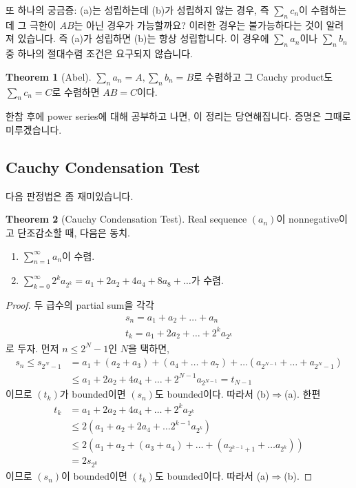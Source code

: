 \documentclass[12pt]{article}
\theoremstyle{definition}
\newtheorem{thm}{Theorem}[section]
\begin{document}
또 하나의 궁금증: (a)는 성립하는데 (b)가 성립하지 않는 경우, 즉 \(\sum_n c_n\)이 수렴하는데 그 극한이 \(AB\)는 아닌 경우가 가능할까요? 이러한 경우는 불가능하다는 것이 알려져 있습니다. 즉 (a)가 성립하면 (b)는 항상 성립합니다. 이 경우에 \(\sum_n a_n\)이나 \(\sum_n b_n\) 중 하나의 절대수렴 조건은 요구되지 않습니다.

\begin{thm}[Abel]
	\(\sum_n a_n = A, \sum_n b_n = B\)로 수렴하고 그 Cauchy product도 \(\sum_n c_n = C\)로 수렴하면 \(AB = C\)이다.
\end{thm}

한참 후에 power series에 대해 공부하고 나면, 이 정리는 당연해집니다. 증명은 그때로 미루겠습니다.

\subsection{Cauchy Condensation Test}

다음 판정법은 좀 재미있습니다.

\begin{thm}[Cauchy Condensation Test]
	Real sequence \((a_n)\)이 nonnegative이고 단조감소할 때, 다음은 동치.
	\begin{enumerate}[label=(\alph*), leftmargin=2\parindent]
		\item
		\(\sum_{n=1}^\infty a_n\)이 수렴.
		\item
		\(\sum_{k=0}^\infty 2^k a_{2^k} = a_1 + 2a_2 + 4a_4 + 8a_8 + \ldots\)가 수렴.
	\end{enumerate}
\end{thm}
\begin{proof}
	두 급수의 partial sum을 각각
	\begin{gather*}
		s_n = a_1 + a_2 + \ldots + a_n\\
		t_k = a_1 + 2a_2 + \ldots + 2^k a_{2^k}
	\end{gather*}
	로 두자. 먼저 \(n \le 2^N - 1\)인 \(N\)을 택하면,
	\begin{align*}
		s_n \le s_{2^N - 1} &= a_1 + (a_2 + a_3) + (a_4 + \ldots + a_7) + \ldots  (a_{2^{N-1}} + \ldots + a_{2^N - 1})\\
		& \le a_1 + 2a_2 + 4a_4 + \ldots + 2^{N-1} a_{2^{N-1}} = t_{N-1}
	\end{align*}
	이므로 \((t_k)\)가 bounded이면 \((s_n)\)도 bounded이다. 따라서 (b)\(\Rightarrow\)(a). 한편
	\begin{align*}
		t_k &= a_1 + 2a_2 + 4a_4 + \ldots + 2^k a_{2^k}\\
		&\le 2(a_1 + a_2 + 2a_4 + \ldots 2^{k-1} a_{2^k})\\
		&\le 2(a_1 + a_2 + (a_3 + a_4) + \ldots + (a_{2^{k-1}+1} + \ldots a_{2^k}))\\
		&= 2s_{2^k}
	\end{align*}
	이므로 \((s_n)\)이 bounded이면 \((t_k)\)도 bounded이다. 따라서 (a)\(\Rightarrow\)(b).
\end{proof}
\end{document}
